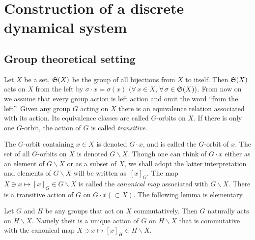 \documentclass[pdftex]{sigma}
\begin{document}
\section{Construction of a discrete dynamical system}\label{sec:2}

\subsection{Group theoretical setting}\label{subsec:2_1}

Let $X$ be a set, ${\frak S}(X)$ be the group of all bijections from $X$ to itself.
Then ${\frak S}(X)$ acts on $X$ from the left by $\sigma \cdot x = \sigma (x)$
$(\forall \, x \in X$, $\forall \, \sigma \in {\frak S}(X))$.
{}From now on we assume that every group action is left action
and omit the word ``from the left''.
Given any group $G$ acting on $X$ there is an equivalence relation associated with its action.
Its equivalence classes are called $G$-orbits on $X$.
If there is only one $G$-orbit, the action of $G$ is called \textit{transitive}.

The $G$-orbit containing $x \in X$ is denoted $G \cdot x$, and is
called the $G$-orbit of $x$.
The set of all $G$-orbits on $X$ is denoted $G \backslash X$.
Though one can think of $G \cdot x$ either as an element of $G \backslash X$ or as a subset of $X$,
we shall adopt the latter interpretation and
elements of $G \backslash X$ will be written as~$[x]_G$.
The map $X \ni x \mapsto [x]_G \in G \backslash X$ is called the \textit{canonical map}
associated with $G \backslash X$.
There is a transitive action of
$G$ on $G \cdot x (\subset X)$.
The following lemma is elementary.

\begin{lemma}\label{lem:jan29_1}
Let $G$ and $H$ be any groups that act on $X$ commutatively.
Then $G$ naturally acts on $H \backslash X$.
Namely their is a unique action of $G$ on $H \backslash X$ that is commutative with
the canonical map $X \ni x \mapsto [x]_H \in H \backslash X$.
\end{lemma}
\end{document}
